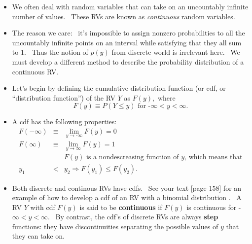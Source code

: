 \documentclass[11pt]{article}
\begin{document}
\begin{itemize}
\item We often deal with random variables that can take on an uncountably
infinite number of values. \ These RVs are known as \textit{continuous }%
random variables.

\item The reason we care: \ it's impossible to assign nonzero probabilities
to all the uncountably infinite points on an interval while satisfying that
they all sum to 1. \ Thus the notion of $p(y)$ from discrete world is
irrelevant here. \ We must develop a different method to describe the
probability distribution of a continuous RV.

\item Let's begin by defining the cumulative distribution function (or cdf,
or \textquotedblleft distribution function\textquotedblright ) of the RV $Y$
as $F(y),$ where%
\begin{equation*}
F(y)\equiv P(Y\leq y)\text{ for -}\infty <y<\infty .
\end{equation*}


\item A cdf has the following properties:%
\begin{eqnarray*}
F(-\infty ) &\equiv &\underset{y\rightarrow \text{-}\infty }{\lim }F(y)=0 \\
F(\infty ) &\equiv &\underset{y\rightarrow \infty }{\lim }F(y)=1 \\
&&F(y)\text{ is a nondescreasing function of }y\text{, which means that} \\
y_{1} &<&y_{2}\Longrightarrow F(y_{1})\leq F(y_{2}).
\end{eqnarray*}

\item Both discrete and continous RVs have cdfs. \ See your text [page 158]
for an example of how to develop a cdf of an RV with a binomial distribution
. \ A RV $Y$ with cdf $F(y)$ is said to be \textbf{continuous} if $F(y)$ is
continuous for -$\infty <y<\infty .$ \ By contrast, the cdf's of discrete
RVs are always \textbf{step }functions: they have discontinuities separating
the possible values of $y$ that they can take on.


\end{itemize}
\end{document}
